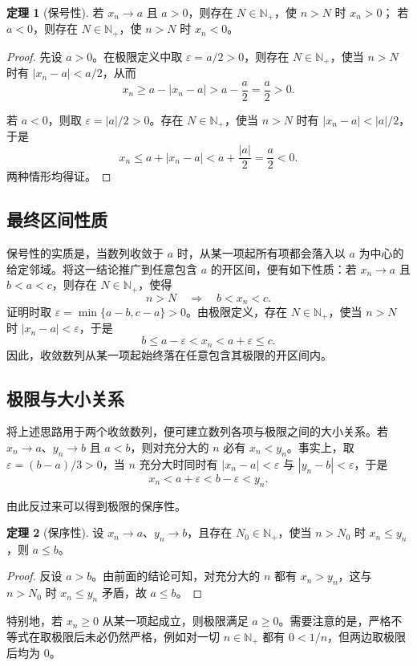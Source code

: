 \documentclass[UTF8, fontset=fandol, a4paper, 12pt]{ctexart}
\newcommand{\Nplus}{\mathbb N_{+}}
\theoremstyle{definition}
\newtheorem{theorem}{定理}
\begin{document}
\begin{theorem}[保号性]
若 $x_n\to a$ 且 $a>0$，则存在 $N\in\Nplus$，使 $n>N$ 时 $x_n>0$；
若 $a<0$，则存在 $N\in\Nplus$，使 $n>N$ 时 $x_n<0$。
\end{theorem}
\begin{proof}
先设 $a>0$。在极限定义中取 $\varepsilon=a/2>0$，则存在 $N\in\Nplus$，使当 $n>N$ 时有 $|x_n-a|<a/2$，从而
\[
 x_n\ge a-|x_n-a|>a-\frac a2=\frac a2>0.
\]

若 $a<0$，则取 $\varepsilon=|a|/2>0$。存在 $N\in\Nplus$，使当 $n>N$ 时有 $|x_n-a|<|a|/2$，于是
\[
 x_n\le a+|x_n-a|<a+\frac{|a|}{2}=\frac a2<0.
\]
两种情形均得证。
\end{proof}

\subsection*{最终区间性质}
保号性的实质是，当数列收敛于 $a$ 时，从某一项起所有项都会落入以 $a$ 为中心的给定邻域。将这一结论推广到任意包含 $a$ 的开区间，便有如下性质：若 $x_n\to a$ 且 $b<a<c$，则存在 $N\in\Nplus$，使得
\[
 n>N\quad\Longrightarrow\quad b<x_n<c.
\]
证明时取 $\varepsilon=\min\{a-b,c-a\}>0$。由极限定义，存在 $N\in\Nplus$，使当 $n>N$ 时 $|x_n-a|<\varepsilon$，于是
\[
 b\le a-\varepsilon<x_n<a+\varepsilon\le c.
\]
因此，收敛数列从某一项起始终落在任意包含其极限的开区间内。

\subsection*{极限与大小关系}
将上述思路用于两个收敛数列，便可建立数列各项与极限之间的大小关系。若 $x_n\to a$、$y_n\to b$ 且 $a<b$，则对充分大的 $n$ 必有 $x_n<y_n$。事实上，取 $\varepsilon=(b-a)/3>0$，当 $n$ 充分大时同时有 $|x_n-a|<\varepsilon$ 与 $|y_n-b|<\varepsilon$，于是
\[
 x_n<a+\varepsilon<b-\varepsilon<y_n.
\]

由此反过来可以得到极限的保序性。

\begin{theorem}[保序性]
设 $x_n\to a$、$y_n\to b$，且存在 $N_0\in\Nplus$，使当 $n>N_0$ 时
$x_n\le y_n$，则 $a\le b$。
\end{theorem}
\begin{proof}
反设 $a>b$。由前面的结论可知，对充分大的 $n$ 都有 $x_n>y_n$，这与 $n>N_0$ 时 $x_n\le y_n$ 矛盾，故 $a\le b$。
\end{proof}

特别地，若 $x_n\ge0$ 从某一项起成立，则极限满足 $a\ge0$。需要注意的是，严格不等式在取极限后未必仍然严格，例如对一切 $n\in\Nplus$ 都有 $0<1/n$，但两边取极限后均为 $0$。
\end{document}
